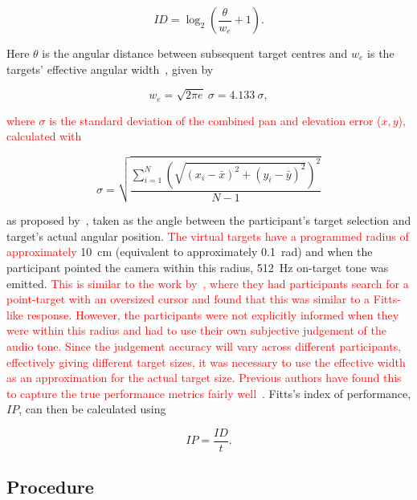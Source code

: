 \documentclass[acmsmall]{acmart}
\newcommand\hl[1]{\textcolor{red}{#1}}
\begin{document}
\begin{equation}
  \label{eq:fitts-id}
  ID = \log_2\left(\frac{\theta}{w_e} + 1\right).
\end{equation}

\noindent
Here $\theta$ is the angular distance between subsequent target centres and $w_e$ is the targets' effective angular width~\citep{welford1968fundamentals}, given by

\begin{equation}
  \label{eq:fitts-we}
  w_e = \sqrt{2\pi e}~\sigma = 4.133~\sigma,
\end{equation}

\noindent \hl{where $\sigma$ is the standard deviation of the combined pan and elevation error ($x, y$), calculated with}

\begin{equation}
  \sigma = \sqrt{\frac{\sum_{i=1}^{N}\left(\sqrt{(x_i-\bar{x})^2 + (y_i - \bar{y})^2}\right)^2}{N-1}}
\end{equation}

\noindent as proposed by~\citet{wobbrock2011effects}, taken as the angle between the participant's target selection and target's actual angular position.
\hl{The virtual targets have a programmed radius of approximately} \SI{10}{\centi\metre} (equivalent to approximately \SI{0.1}{\radian}) and when the participant pointed the camera within this radius, \SI{512}{\hertz} on-target tone was emitted.
\hl{This is similar to the work by}~\citet{kabbash1995prince}\hl{, where they had participants search for a point-target with an oversized cursor and found that this was similar to a Fitts-like response.
However, the participants were not explicitly informed when they were within this radius and had to use their own subjective judgement of the audio tone.
Since the judgement accuracy will vary across different participants, effectively giving different target sizes, it was necessary to use the effective width as an approximation for the actual target size.
Previous authors have found this to capture the true performance metrics fairly well}~\citep{zhai2004speed}.
Fitts's index of performance, $IP$, can then be calculated using 

\begin{equation}
  \label{eq:fitts-performance}
  IP = \frac{ID}{t}.
\end{equation}

\subsection{Procedure}
\end{document}
